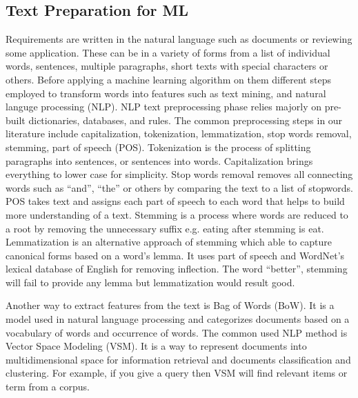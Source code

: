 \subsection{Text Preparation for ML}
\label{sec:preprocessing}

Requirements are written in the natural language such as documents or reviewing
some application. These can be in a variety of forms from a list of individual
words, sentences, multiple paragraphs, short texts with special characters or
others. Before applying a machine learning algorithm on them different steps
employed to transform words into features such as text mining, and natural languge processing (NLP). NLP text preprocessing phase relies
majorly on pre-built dictionaries, databases, and rules. The common
preprocessing steps in our literature include capitalization, tokenization,
lemmatization, stop words removal, stemming, part of speech (POS). Tokenization
is the process of splitting paragraphs into sentences, or sentences into words.
Capitalization brings everything to lower case for simplicity. Stop words
removal removes all connecting words such as ``and'', ``the'' or others by
comparing the text to a list of stopwords. POS takes text and assigns each part of speech to each
word that helps to build more understanding of a text. Stemming is a process
where words are reduced to a root by removing the unnecessary suffix e.g. eating
after stemming is eat. Lemmatization is an alternative approach of stemming which
able to capture canonical forms based on a word's lemma. It uses part of speech
and WordNet’s lexical database of English for removing inflection. The word
``better'', stemming will fail to provide any lemma but lemmatization would result
good.

 Another way to extract features from the text is Bag of Words (BoW). It is a
 model used in natural language processing and categorizes documents based on a
 vocabulary of words and occurrence of words. The common used NLP method is
 Vector Space Modeling (VSM). It is a way to represent documents into
 multidimensional space for information retrieval and documents classification
 and clustering. For example, if you give a query then VSM will find relevant items
 or term from a corpus.


